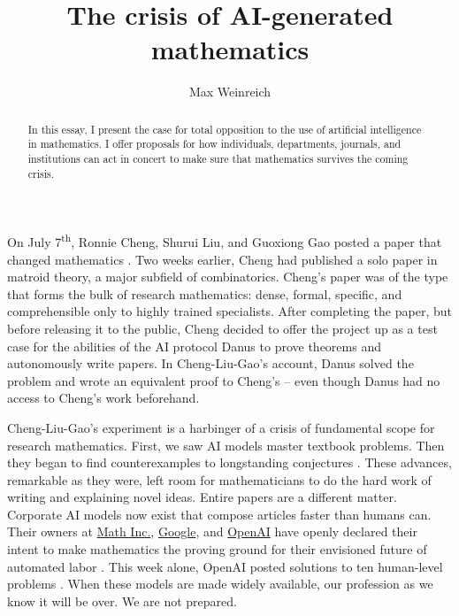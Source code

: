 \documentclass[12pt]{amsart}
\title{The crisis of AI-generated mathematics}
\author{Max Weinreich}
\theoremstyle{definition}
\begin{document}
\begin{abstract}
    In this essay, I present the case for total opposition to the use of artificial intelligence in mathematics. I offer proposals for how individuals, departments, journals, and institutions can act in concert to make sure that mathematics survives the coming crisis.
\end{abstract}

\maketitle


On July 7\textsuperscript{th}, Ronnie Cheng, Shurui Liu, and Guoxiong Gao posted a paper that changed mathematics \cite{cheng2026ai}. 
Two weeks earlier, Cheng had published a solo paper \cite{cheng2026tangentclassesmatroidbuilding} in matroid theory, a major subfield of combinatorics. Cheng's paper was of the type that forms the bulk of research mathematics: dense, formal, specific, and comprehensible only to highly trained specialists. After completing the paper, but before releasing it to the public, Cheng decided to offer the project up as a test case for the abilities of the AI protocol Danus \cite{danus} to prove theorems and autonomously write papers. In Cheng-Liu-Gao's account, Danus solved the problem and wrote an equivalent proof to Cheng's – even though Danus had no access to Cheng's work beforehand.


Cheng-Liu-Gao's experiment is a harbinger of a crisis of fundamental scope for research mathematics. First, we saw AI models master textbook problems. Then they began to find counterexamples to longstanding conjectures \cite{openaierdos, taodigestion}. These advances, remarkable as they were, left room for mathematicians to do the hard work of writing and explaining novel ideas. Entire papers are a different matter. Corporate AI models now exist that compose articles faster than humans can. Their owners at \href{https://www.math.inc/vision}{Math Inc.}, \href{https://deepmind.google/blog/accelerating-mathematical-and-scientific-discovery-with-gemini-deep-think/}{Google}, and \href{https://openai.com/index/model-disproves-discrete-geometry-conjecture/}{OpenAI} have openly declared their intent to make mathematics the proving ground for their envisioned future of automated labor \cite{googledeepmind, mathinc, openaierdos}. This week alone, OpenAI posted solutions to ten human-level problems \cite{openaiten}. When these models are made widely available, our profession as we know it will be over. We are not prepared.
\end{document}

